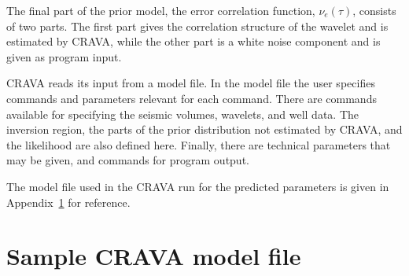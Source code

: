\documentclass[screen,citenumeric,long,10pt]{nrdoc_060418}
\newcommand{\cet}{\nu_e}
\newcommand{\crava} {\textsf{CRAVA}\xspace}
\begin{document}
\begin{multicols}{2}
The final part of the prior model, the error correlation function,
$\cet(\tau)$, consists of two parts. The first part gives the
correlation structure of the wavelet and is estimated by \crava, while
the other part is a white noise component and is given as program
input. 

\crava reads its input from a model file. In the model file the user
specifies commands and parameters relevant for each command. There are
commands available for specifying the seismic volumes, wavelets, and
well data. The inversion region, the parts of the prior distribution
not estimated by \crava, and the likelihood are also defined
here. Finally, there are technical parameters that may be given, and
commands for program output.

The model file used in the \crava run for the predicted parameters is
given in Appendix~\ref{sec:crava-model-file} for reference.
%
%
\newpage
\end{multicols}


\appendix


\chapter{Sample \crava model file}
\label{sec:crava-model-file}

\vspace{-2em}
\end{document}
